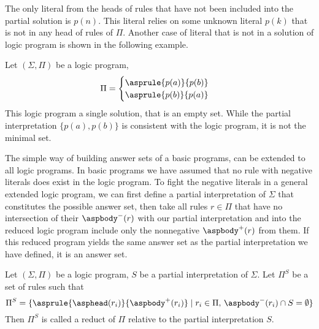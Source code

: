 The only literal from the heads of rules that have not been included
into the partial solution is $p(n)$. This literal relies
on some unknown literal $p(k)$ that is not in any head of rules of $\Pi$.
Another case of literal that is not in a solution of logic program
is shown in the following example.

\begin{example}\label{example:cycle}
    Let $(\Sigma, \Pi)$ be a logic program,
    \begin{equation*}
        \Pi =
            \begin{cases}
                \asprule{p(a)}{p(b)}\\
                \asprule{p(b)}{p(a)}\\
            \end{cases}
    \end{equation*}
    This logic program a single solution, that is an empty set.
    While the partial interpretation $\{p(a), p(b)\}$ is consistent
    with the logic program, it is not the minimal set.
\end{example}

The simple way of building answer sets of a basic programs,
can be extended to all logic programs. In basic programs we have assumed
that no rule with negative literals does exist in the logic program.
To fight the negative literals in a general extended logic program,
we can first define a partial interpretation of $\Sigma$ that constitutes
the possible answer set, then take all rules $r\in\Pi$ that have no intersection
of their $\aspbody^-(r)$ with our partial interpretation and into the reduced logic program
include only the nonnegative $\aspbody^+(r)$ from them. If this reduced program
yields the same answer set as the partial interpretation we have defined,
it is an answer set.

\begin{definition}
    Let $(\Sigma, \Pi)$ be a logic program, $S$ be a partial interpretation of $\Sigma$.
    Let $\Pi^S$ be a set of rules such that
    \begin{equation*}
        \Pi^S = \{\asprule{\asphead(r_i)}{\aspbody^+(r_i)}
                  \mid r_i\in \Pi,\,\aspbody^-(r_i)\cap S = \emptyset\}
    \end{equation*}
    Then $\Pi^S$ is called a reduct of $\Pi$ relative to the partial interpretation $S$.
\end{definition}

